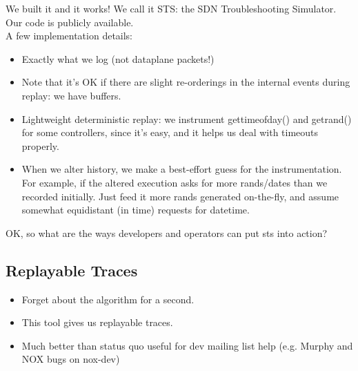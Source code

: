 
We built it and it works! We call it STS: the SDN Troubleshooting Simulator.
Our code is publicly available.\\


A few implementation details:

\begin{itemize}
\item Exactly what we log (not dataplane packets!)
\item Note that it's OK if there are slight re-orderings in the internal
events during replay: we have buffers.
\item Lightweight deterministic replay: we instrument gettimeofday() and getrand() for some controllers, since it's easy, and it helps us deal with timeouts properly.
\item When we alter history, we make a best-effort guess for the
instrumentation. For example, if the altered execution asks for more rands/dates than we recorded initially. Just feed it more rands generated on-the-fly, and assume somewhat equidistant (in time) requests for datetime.
\end{itemize}

OK, so what are the ways developers and operators can put sts into action?

\subsection{Replayable Traces}
\begin{itemize}
\item Forget about the algorithm for a second.
\item This tool gives us replayable traces.
\item Much better than status quo useful for dev mailing list help (e.g. Murphy and NOX bugs on nox-dev)
\end{itemize}

